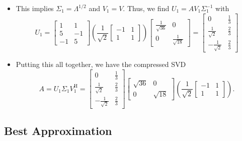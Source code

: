 \documentclass[11pt,twoside]{report}
\newcommand{\Herm}{{\mathrm{H}}}
\begin{document}
\begin{itemize}
\begin{itemize}
\item 
This implies $\Sigma_1 = \Lambda^{1/2}$ and $V_1 = V$.
Thus, we find $U_1 = A V_1 \Sigma_1^{-1}$ with 
\[ 
U_1 = \begin{bmatrix} 
1 & 1 \\
5 & -1 \\
-1 & 5 
\end{bmatrix} 
\left( \frac{1}{\sqrt{2}} \begin{bmatrix} 
-1 & 1 \\
1 & 1
\end{bmatrix}  \right)
 \begin{bmatrix} 
\frac{1}{\sqrt{36}} & 0 \\
0 & \frac{1}{\sqrt{18}}
\end{bmatrix} 
= \begin{bmatrix} 
0 & \frac{1}{3} \\
\frac{1}{\sqrt{2}} & \frac{2}{3}  \\
-\frac{1}{\sqrt{2}} & \frac{2}{3} 
\end{bmatrix} 
\]

\item 
Putting this all together, we have the compressed SVD 
\[ 
A = U_1 \Sigma_1 V_1^\Herm 
= \begin{bmatrix} 
0 & \frac{1}{3} \\
\frac{1}{\sqrt{2}} & \frac{2}{3}  \\
-\frac{1}{\sqrt{2}} & \frac{2}{3} 
\end{bmatrix} 
 \begin{bmatrix} 
\sqrt{36} & 0 \\
0 & \sqrt{18}
\end{bmatrix} 
\left( \frac{1}{\sqrt{2}}  \begin{bmatrix} 
-1 & 1 \\
1 & 1 
\end{bmatrix} \right). \]
\end{itemize}

\end{itemize}


\subsection{Best Approximation} 
\end{document}
